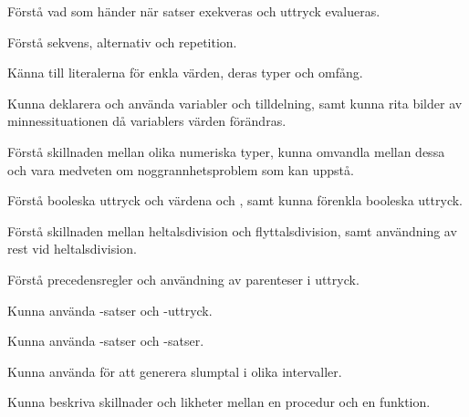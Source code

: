 
\item Förstå vad som händer när satser exekveras och uttryck evalueras.
\item Förstå sekvens, alternativ och repetition.
\item Känna till literalerna för enkla värden, deras typer och omfång.
\item Kunna deklarera och använda variabler och tilldelning, samt kunna rita bilder av minnessituationen då variablers värden förändras.
\item Förstå skillnaden mellan olika numeriska typer, kunna omvandla mellan dessa och vara medveten om noggrannhetsproblem som kan uppstå.
\item Förstå booleska uttryck och värdena  och , samt kunna förenkla booleska uttryck.
\item Förstå skillnaden mellan heltalsdivision och flyttalsdivision, samt användning av rest vid heltalsdivision.
\item Förstå precedensregler och användning av parenteser i uttryck.
\item Kunna använda -satser och -uttryck.
\item Kunna använda -satser och -satser.
\item Kunna använda  för att generera slumptal i olika intervaller.
\item Kunna beskriva skillnader och likheter mellan en procedur och en funktion.
